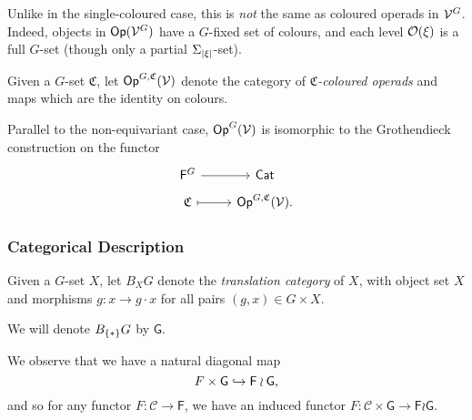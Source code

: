 \documentclass[psamsfonts,onesided,10pt
,draft
]{amsart}%
\begin{document}
\begin{remark}
      Unlike in the single-coloured case, this is \textit{not} the same as coloured operads in $\mathcal V^G$.
      Indeed, objects in $\mathsf{Op}(\mathcal V^G)$ have a $G$-fixed set of colours, and each level $\mathcal{O}(\xi)$ is a full $G$-set
      (though only a partial $\Sigma_{|\xi|}$-set).
\end{remark}

\begin{definition}
      Given a $G$-set $\mathfrak C$, let $\mathsf{Op}^{G,\mathfrak C}(\mathcal V)$ denote the category of \textit{$\mathfrak C$-coloured operads} and maps which are the identity on colours.

      Parallel to the non-equivariant case, $\mathsf{Op}^G(\mathcal V)$ is isomorphic to the Grothendieck construction on the functor
            \begin{equation}
            \begin{tikzcd}[row sep = tiny]
                  \mathsf F^G \arrow[r] & \mathsf{Cat}
                  \\
                  \mathfrak C \arrow[r, mapsto] & \Op^{G,\mathfrak C}(\V).
            \end{tikzcd}
      \end{equation}
      
\end{definition}

\subsubsection{Categorical Description}

\begin{definition}
      Given a $G$-set $X$, let $B_XG$ denote the \textit{translation category} of $X$,
      with object set $X$ and morphisms $g: x \to g\cdot x$ for all pairs $(g,x) \in G \times X$.

      We will denote $B_{\set{\**}}G$ by $\mathsf G$.
\end{definition}

\begin{remark}
      We observe that we have a natural diagonal map
      \begin{equation}
            F \times \mathsf G \hookrightarrow \mathsf F \wr \mathsf G,
      \end{equation}
      and so for any functor $F: \mathcal C \to \mathsf F$, we have an induced functor
      $F: \mathcal C \times \mathsf G \to \mathsf F \wr \mathsf G$. 
\end{remark}
\end{document}
